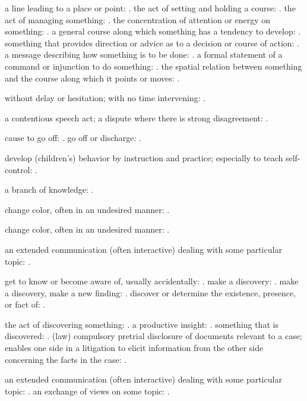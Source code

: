   a line leading to a place or point: . the act of setting and holding a course: . the act of managing something: . the concentration of attention or energy on something: . a general course along which something has a tendency to develop: . something that provides direction or advice as to a decision or course of action: . a message describing how something is to be done: . a formal statement of a command or injunction to do something: . the spatial relation between something and the course along which it points or moves: .

  without delay or hesitation; with no time intervening: .

  a contentious speech act; a dispute where there is strong disagreement: .

  cause to go off: . go off or discharge: .

  develop (children's) behavior by instruction and practice; especially to teach self-control: .

  a branch of knowledge: .

  change color, often in an undesired manner: .

  change color, often in an undesired manner: .

  an extended communication (often interactive) dealing with some particular topic: .

  get to know or become aware of, usually accidentally: . make a discovery: . make a discovery, make a new finding: . discover or determine the existence, presence, or fact of: .

  the act of discovering something: . a productive insight: . something that is discovered: . (law) compulsory pretrial disclosure of documents relevant to a case; enables one side in a litigation to elicit information from the other side concerning the facts in the case: .

  an extended communication (often interactive) dealing with some particular topic: . an exchange of views on some topic: .

